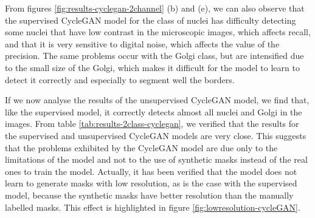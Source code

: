 From figures \ref{fig:results-cyclegan-2channel} (b) and (e), we can also observe that the supervised CycleGAN model for the class of nuclei has difficulty detecting some nuclei that have low contrast in the microscopic images, which affects recall, and that it is very sensitive to digital noise, which affects the value of the precision. The same problems occur with the Golgi class, but are intensified due to the small size of the Golgi, which makes it difficult for the model to learn to detect it correctly and especially to segment well the borders.

If we now analyse the results of the unsupervised CycleGAN model, we find that, like the supervised model, it correctly detects almost all nuclei and Golgi in the images. From table \ref{tab:results-2class-cyclegan}, we verified that the results for the supervised and unsupervised CycleGAN models are very close. This suggests that the problems exhibited by the CycleGAN model are due only to the limitations of the model and not to the use of synthetic masks instead of the real ones to train the model. Actually, it has been verified that the model does not learn to generate masks with low resolution, as is the case with the supervised model, because the synthetic masks have better resolution than the manually labelled masks. This effect is highlighted in figure \ref{fig:lowresolution-cycleGAN}.


